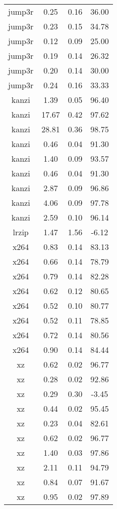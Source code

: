 \begin{table}[h]
\begin{tabular}{|c|c|c|c|}
        jump3r & 0.25 & 0.16 & 36.00 \\
        jump3r & 0.23 & 0.15 & 34.78 \\
        jump3r & 0.12 & 0.09 & 25.00 \\
        jump3r & 0.19 & 0.14 & 26.32 \\
        jump3r & 0.20 & 0.14 & 30.00 \\
        jump3r & 0.24 & 0.16 & 33.33 \\
        kanzi & 1.39 & 0.05 & 96.40 \\
        kanzi & 17.67 & 0.42 & 97.62 \\
        kanzi & 28.81 & 0.36 & 98.75 \\
        kanzi & 0.46 & 0.04 & 91.30 \\
        kanzi & 1.40 & 0.09 & 93.57 \\
        kanzi & 0.46 & 0.04 & 91.30 \\
        kanzi & 2.87 & 0.09 & 96.86 \\
        kanzi & 4.06 & 0.09 & 97.78 \\
        kanzi & 2.59 & 0.10 & 96.14 \\
        lrzip & 1.47 & 1.56 & -6.12 \\
        x264 & 0.83 & 0.14 & 83.13 \\
        x264 & 0.66 & 0.14 & 78.79 \\
        x264 & 0.79 & 0.14 & 82.28 \\
        x264 & 0.62 & 0.12 & 80.65 \\
        x264 & 0.52 & 0.10 & 80.77 \\
        x264 & 0.52 & 0.11 & 78.85 \\
        x264 & 0.72 & 0.14 & 80.56 \\
        x264 & 0.90 & 0.14 & 84.44 \\
        xz & 0.62 & 0.02 & 96.77 \\
        xz & 0.28 & 0.02 & 92.86 \\
        xz & 0.29 & 0.30 & -3.45 \\
        xz & 0.44 & 0.02 & 95.45 \\
        xz & 0.23 & 0.04 & 82.61 \\
        xz & 0.62 & 0.02 & 96.77 \\
        xz & 1.40 & 0.03 & 97.86 \\
        xz & 2.11 & 0.11 & 94.79 \\
        xz & 0.84 & 0.07 & 91.67 \\
        xz & 0.95 & 0.02 & 97.89 \\

\end{tabular}
\end{table}
